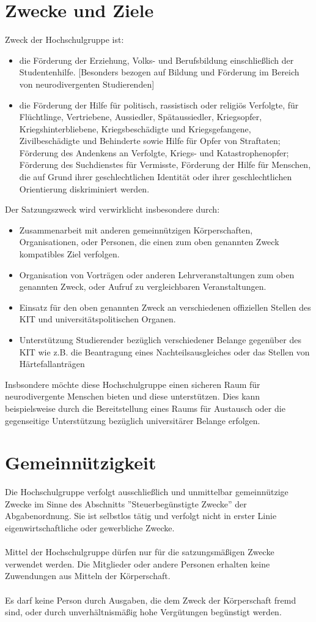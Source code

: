 \documentclass[11pt]{article}
\begin{document}
	\section{Zwecke und Ziele}
    \label{zweck}
	Zweck der Hochschulgruppe ist:
	\begin{itemize}
		\item die Förderung der Erziehung, Volks- und Berufsbildung einschließlich der Studentenhilfe. [Besonders bezogen auf Bildung und Förderung im Bereich von neurodivergenten Studierenden]
		\item die Förderung der Hilfe für politisch, rassistisch oder religiös Verfolgte, für Flüchtlinge, Vertriebene, Aussiedler, Spätaussiedler, Kriegsopfer, Kriegshinterbliebene, Kriegsbeschädigte und Kriegsgefangene, Zivilbeschädigte und Behinderte sowie Hilfe für Opfer von Straftaten; Förderung des Andenkens an Verfolgte, Kriegs- und Katastrophenopfer; Förderung des Suchdienstes für Vermisste, Förderung der Hilfe für Menschen, die auf Grund ihrer geschlechtlichen Identität oder ihrer geschlechtlichen Orientierung diskriminiert werden.
	\end{itemize}
	Der Satzungszweck wird verwirklicht insbesondere durch:
	\begin{itemize}
		\item Zusammenarbeit mit anderen gemeinnützigen Körperschaften, Organisationen, oder Personen, die einen zum oben genannten Zweck kompatibles Ziel verfolgen.
		\item Organisation von Vorträgen oder anderen Lehrveranstaltungen zum oben genannten Zweck, oder Aufruf zu vergleichbaren Veranstaltungen.
		\item Einsatz für den oben genannten Zweck an verschiedenen offiziellen Stellen des KIT und universitätspolitischen Organen.
        \item Unterstützung Studierender bezüglich verschiedener Belange gegenüber des KIT wie z.B. die Beantragung eines Nachteilsausgleiches oder das Stellen von Härtefallanträgen
	\end{itemize}
    Insbsondere möchte diese Hochschulgruppe einen sicheren Raum für neurodivergente Menschen bieten und diese unterstützen. Dies kann beispielsweise durch die Bereitstellung eines Raums für Austausch oder die gegenseitige Unterstützung bezüglich universitärer Belange erfolgen.
 
	\section{Gemeinnützigkeit}
	Die Hochschulgruppe verfolgt ausschließlich und unmittelbar gemeinnützige Zwecke im Sinne
	des Abschnitts ''Steuerbegünstigte Zwecke'' der Abgabenordnung. Sie ist selbstlos tätig und verfolgt
	nicht in erster Linie eigenwirtschaftliche oder gewerbliche Zwecke.\\\\
	Mittel der Hochschulgruppe dürfen nur für die satzungsmäßigen Zwecke verwendet werden. Die
	Mitglieder oder andere Personen erhalten keine Zuwendungen aus Mitteln der Körperschaft.\\\\
	Es darf keine Person durch Ausgaben, die dem Zweck der Körperschaft fremd sind, oder durch
	unverhältnismäßig hohe Vergütungen begünstigt werden.
\end{document}
